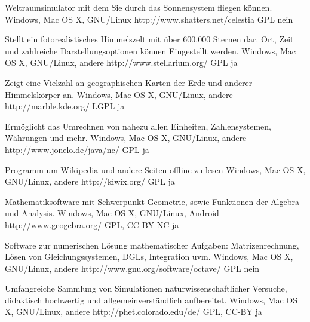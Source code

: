 \documentclass[11pt,a4paper,landscape,twocolumn]{article}
\begin{document}


{Weltraumsimulator mit dem Sie durch das Sonnensystem fliegen können.}
{Windows, Mac OS X, GNU/Linux}
{http://www.shatters.net/celestia}
{GPL}
{nein}

{Stellt ein fotorealistisches Himmelszelt mit über 600.000 Sternen dar. Ort, Zeit und zahlreiche Darstellungsoptionen können Eingestellt werden.}
{Windows, Mac OS X, GNU/Linux, andere}
{http://www.stellarium.org/}
{GPL}
{ja}

{Zeigt eine Vielzahl an geographischen Karten der Erde und anderer Himmelskörper an.}
{Windows, Mac OS X, GNU/Linux, andere}
{http://marble.kde.org/}
{LGPL}
{ja}

{Ermöglicht das Umrechnen von nahezu allen Einheiten, Zahlensystemen, Währungen und mehr.}
{Windows, Mac OS X, GNU/Linux, andere}
{http://www.jonelo.de/java/nc/}
{GPL}
{ja}

\newpage %

{Programm um Wikipedia und andere Seiten offline zu lesen}
{Windows, Mac OS X, GNU/Linux, andere}
{http://kiwix.org/}
{GPL}
{ja}

{Mathematiksoftware mit Schwerpunkt Geometrie, sowie Funktionen der Algebra und Analysis.}
{Windows, Mac OS X, GNU/Linux, Android}
{http://www.geogebra.org/}
{GPL, CC-BY-NC}
{ja}

{Software zur numerischen Lösung mathematischer Aufgaben: Matrizenrechnung, Lösen von Gleichungssystemen, DGLs, Integration uvm.}
{Windows, Mac OS X, GNU/Linux, andere}
{http://www.gnu.org/software/octave/}
{GPL}
{nein}

{Umfangreiche Sammlung von Simulationen naturwissenschaftlicher Versuche, didaktisch hochwertig und allgemeinverständlich aufbereitet.}
{Windows, Mac OS X, GNU/Linux, andere}
{http://phet.colorado.edu/de/}
{GPL, CC-BY}
{ja}
\end{document}
